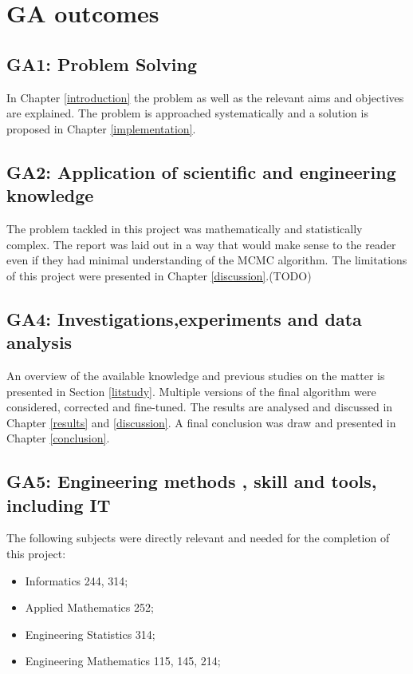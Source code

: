 \chapter{GA outcomes}
\section*{GA1: Problem Solving}
In Chapter \ref{introduction} the problem as well as the relevant aims and objectives are explained. The problem is approached systematically and a solution is proposed in Chapter \ref{implementation}.
\section*{GA2: Application of scientific and engineering knowledge}
The problem tackled in this project was mathematically and statistically complex. 
The report was laid out in a way that would make sense to the reader even if they had minimal understanding of the MCMC algorithm. 
The limitations of this project were presented in Chapter \ref{discussion}.(TODO)
\section*{GA4: Investigations,experiments and data analysis}
An overview of the available knowledge and previous studies on the matter is presented in Section \ref{litstudy}. 
Multiple versions of the final algorithm were considered, corrected and fine-tuned. The results are analysed and discussed in Chapter \ref{results} and \ref{discussion}. A final conclusion was draw and presented in Chapter \ref{conclusion}.
\section*{GA5: Engineering methods , skill and tools, including IT}
The following subjects were directly relevant and needed for the completion of this project:\
\begin{itemize}
\item Informatics 244, 314;
\item Applied Mathematics 252;
\item Engineering Statistics 314;
\item Engineering Mathematics 115, 145, 214;
\end{itemize}

